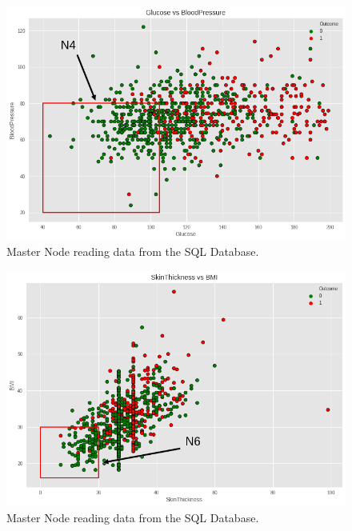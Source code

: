 \documentclass[12pt]{article}
\begin{document}
\begin{figure}[ht]
\centering
\includegraphics[width=1\textwidth]{download(3).png}
\caption{Master Node reading data from the SQL Database.}
\end{figure}

\begin{figure}[ht]
\centering
\includegraphics[width=1\textwidth]{download(4).png}
\caption{Master Node reading data from the SQL Database.}
\end{figure}
\end{document}

